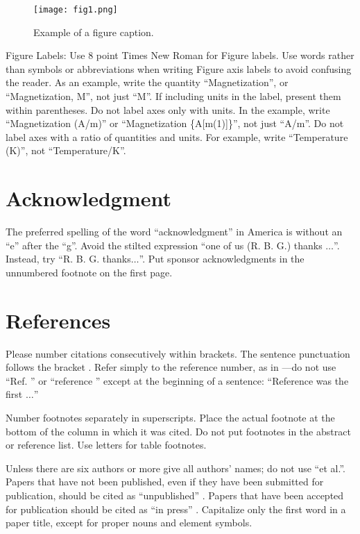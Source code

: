 \documentclass[conference]{IEEEtran}
\begin{document}
\begin{figure}[htbp]
\centerline{\texttt{[image: fig1.png]}}
\caption{Example of a figure caption.}
\label{fig}
\end{figure}

Figure Labels: Use 8 point Times New Roman for Figure labels. Use words 
rather than symbols or abbreviations when writing Figure axis labels to 
avoid confusing the reader. As an example, write the quantity 
``Magnetization'', or ``Magnetization, M'', not just ``M''. If including 
units in the label, present them within parentheses. Do not label axes only 
with units. In the example, write ``Magnetization (A/m)'' or ``Magnetization 
\{A[m(1)]\}'', not just ``A/m''. Do not label axes with a ratio of 
quantities and units. For example, write ``Temperature (K)'', not 
``Temperature/K''.

\section*{Acknowledgment}

The preferred spelling of the word ``acknowledgment'' in America is without 
an ``e'' after the ``g''. Avoid the stilted expression ``one of us (R. B. 
G.) thanks $\ldots$''. Instead, try ``R. B. G. thanks$\ldots$''. Put sponsor 
acknowledgments in the unnumbered footnote on the first page.

\section*{References}

Please number citations consecutively within brackets. The 
sentence punctuation follows the bracket \cite{b2}. Refer simply to the reference 
number, as in \cite{b3}---do not use ``Ref. \cite{b3}'' or ``reference \cite{b3}'' except at 
the beginning of a sentence: ``Reference \cite{b3} was the first $\ldots$''

Number footnotes separately in superscripts. Place the actual footnote at 
the bottom of the column in which it was cited. Do not put footnotes in the 
abstract or reference list. Use letters for table footnotes.

Unless there are six authors or more give all authors' names; do not use 
``et al.''. Papers that have not been published, even if they have been 
submitted for publication, should be cited as ``unpublished'' \cite{b4}. Papers 
that have been accepted for publication should be cited as ``in press'' \cite{b5}. 
Capitalize only the first word in a paper title, except for proper nouns and 
element symbols.
\end{document}
